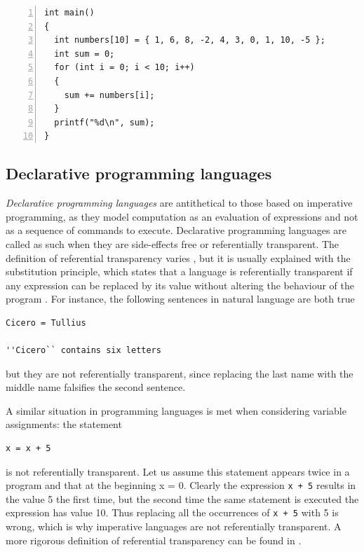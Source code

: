 \begin{lstlisting}[numbers = left, caption = C code to compute the sum of a sequence of numbers, label = lst:ch1_c_code]
int main()
{
  int numbers[10] = { 1, 6, 8, -2, 4, 3, 0, 1, 10, -5 };
  int sum = 0;
  for (int i = 0; i < 10; i++)
  {
    sum += numbers[i];
  }
  printf("%d\n", sum);
}
\end{lstlisting}

\subsection*{Declarative programming languages}
\textit{Declarative programming languages} are antithetical to those based on imperative programming, as they model computation as an evaluation of expressions and not as a sequence of commands to execute. Declarative programming languages are called as such when they are side-effects free or referentially transparent. The definition of referential transparency varies \cite{quine2013word}, but it is usually explained with the substitution principle, which states that a language is referentially transparent if any expression can be replaced by its value without altering the behaviour of the program \cite{mitchell2003concepts}. For instance, the following sentences in natural language are both true

\begin{lstlisting}
Cicero = Tullius

''Cicero`` contains six letters
\end{lstlisting} 

\noindent
but they are not referentially transparent, since replacing the last name with the middle name falsifies the second sentence.

A similar situation in programming languages is met when considering variable assignments: the statement

\begin{lstlisting}
x = x + 5
\end{lstlisting}

\noindent
is not referentially transparent. Let us assume this statement appears twice in a program and that at the beginning x = 0. Clearly the expression \texttt{x + 5} results in the value 5 the first time, but the second time the same statement is executed the expression has value 10. Thus replacing all the occurrences of \texttt{x + 5} with 5 is wrong, which is why imperative languages are not referentially transparent. A more rigorous definition of referential transparency can be found in \cite{sondergaard1990referential}.

